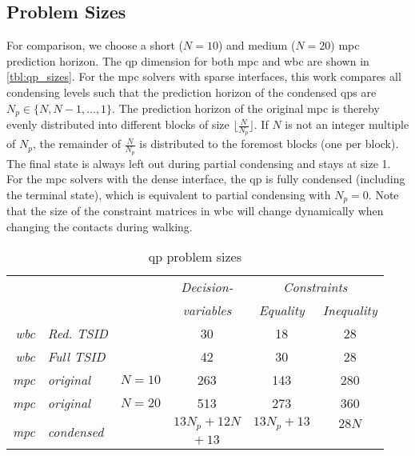 \subsection{Problem Sizes}
For comparison, we choose a short ($N=10$) and medium ($N=20$) \gls{mpc} prediction horizon.
The \gls{qp} dimension for both \gls{mpc} and \gls{wbc} are shown in \autoref{tbl:qp_sizes}.
For the \gls{mpc} solvers with sparse interfaces, this work compares all condensing levels such that the prediction horizon of the condensed \gls{qp}s are $N_p\in \{N,N-1,\dots,1\}$. 
The prediction horizon of the original \gls{mpc} is thereby evenly distributed into different blocks of size $\lfloor \frac{N}{N_p} \rfloor$. If $N$ is not an integer multiple of $N_p$, the remainder of $\frac{N}{N_p}$ is distributed to the foremost blocks (one per block). 
The final state is always left out during partial condensing and stays at size 1.
For the \gls{mpc} solvers with the dense interface, the \gls{qp} is fully condensed (including the terminal state), which is equivalent to partial condensing with $N_p=0$.
Note that the size of the constraint matrices in \gls{wbc} will change dynamically when changing the contacts during walking.
\begin{table}[htbp]\centering
\caption{\gls{qp} problem sizes}
\label{tbl:qp_sizes}
\begin{tabular}{@{}rllccc@{}}\toprule
& & & \emph{Decision-} & \multicolumn{2}{c}{\emph{Constraints}}\\
&  & & \emph{variables} & \emph{Equality} & \emph{Inequality}\\
\midrule
\emph{\gls{wbc}} & \textit{Red. TSID}& & 30 &  18 & 28\\
\emph{\gls{wbc}} & \textit{Full TSID}& & 42 &  30 & 28\\
\midrule
\emph{\gls{mpc}} &\textit{original} & $N=10$ & 263 &  143 & 280\\
\emph{\gls{mpc}} &\textit{original} & $N=20$ & 513 & 273 &  360 \\
\multirow{2}{*}{\emph{\gls{mpc}}} &\multirow{2}{*}{\textit{condensed}} & & $13N_p + 12N $  & $13N_p + 13$ & $ 28N $  \\
& & &  $+~13$ &  &  \\
\bottomrule
\end{tabular}
\vspace{-1em}
\end{table}

